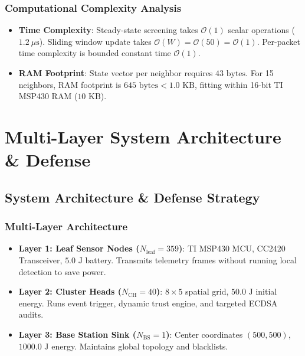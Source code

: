 \documentclass[11pt,a4paper,oneside]{book}
\begin{document}
\section{Computational Complexity Analysis}
\begin{itemize}
    \item \textbf{Time Complexity}: Steady-state screening takes $\mathcal{O}(1)$ scalar operations ($1.2\ \mu\text{s}$). Sliding window update takes $\mathcal{O}(W) = \mathcal{O}(50) = \mathcal{O}(1)$. Per-packet time complexity is bounded constant time $\mathcal{O}(1)$.
    \item \textbf{RAM Footprint}: State vector per neighbor requires $43\text{ bytes}$. For 15 neighbors, RAM footprint is $645\text{ bytes} < 1.0\text{ KB}$, fitting within 16-bit TI MSP430 RAM ($10\text{ KB}$).
\end{itemize}

\part{Multi-Layer System Architecture \& Defense}

\chapter{System Architecture \& Defense Strategy}

\section{Multi-Layer Architecture}
\begin{itemize}
    \item \textbf{Layer 1: Leaf Sensor Nodes ($N_{\text{leaf}} = 359$)}: TI MSP430 MCU, CC2420 Transceiver, $5.0\text{ J}$ battery. Transmits telemetry frames without running local detection to save power.
    \item \textbf{Layer 2: Cluster Heads ($N_{\text{CH}} = 40$)}: $8 \times 5$ spatial grid, $50.0\text{ J}$ initial energy. Runs event trigger, dynamic trust engine, and targeted ECDSA audits.
    \item \textbf{Layer 3: Base Station Sink ($N_{\text{BS}} = 1$)}: Center coordinates $(500, 500)$, $1000.0\text{ J}$ energy. Maintains global topology and blacklists.
\end{itemize}
\end{document}
